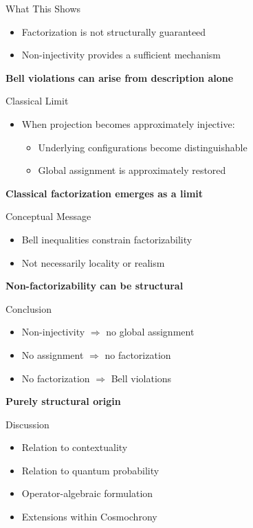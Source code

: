 \documentclass{beamer}
\begin{document}
  \begin{frame}{What This Shows}
    \begin{itemize}
      \item Factorization is not structurally guaranteed
      \item Non-injectivity provides a sufficient mechanism
    \end{itemize}

    \medskip

    \textbf{Bell violations can arise from description alone}
  \end{frame}

  \begin{frame}{Classical Limit}
    \begin{itemize}
      \item When projection becomes approximately injective:
      \begin{itemize}
        \item Underlying configurations become distinguishable
        \item Global assignment is approximately restored
      \end{itemize}
    \end{itemize}

    \medskip

    \textbf{Classical factorization emerges as a limit}
  \end{frame}

  \begin{frame}{Conceptual Message}
    \begin{itemize}
      \item Bell inequalities constrain factorizability
      \item Not necessarily locality or realism
    \end{itemize}

    \medskip

    \textbf{Non-factorizability can be structural}
  \end{frame}

  \begin{frame}{Conclusion}
    \begin{itemize}
      \item Non-injectivity $\Rightarrow$ no global assignment
      \item No assignment $\Rightarrow$ no factorization
      \item No factorization $\Rightarrow$ Bell violations
    \end{itemize}

    \medskip

    \textbf{Purely structural origin}
  \end{frame}

  \begin{frame}{Discussion}
    \begin{itemize}
      \item Relation to contextuality
      \item Relation to quantum probability
      \item Operator-algebraic formulation
      \item Extensions within Cosmochrony
    \end{itemize}
  \end{frame}
\end{document}
